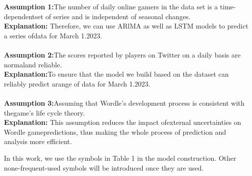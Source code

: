 \documentclass[12pt]{ctexart}
\begin{document}
\textbf{Assumption 1:}The number of daily online gamers in the data set is a time-dependentset of series and is independent of seasonal changes.
\\
\textbf{Explanation:} Therefore, we can use ARlMA as well as LSTM models to predict a series ofdata for March 1.2023.
\\
\\
\textbf{Assumption 2:}The scores reported by players on Twitter on a daily basis are normaland reliable.
\\
\textbf{Explanation:}To ensure that the model we build based on the dataset can reliably predict arange of data for March 1.2023.
\\
\\
\textbf{Assumption 3:}Assuming that Wordle's development process is consistent with thegame's life cycle theory.
\\
\textbf{Explanation:} This assumption reduces the impact ofexternal uncertainties on Wordle gamepredictions, thus making the whole process of prediction and analysis more efficient.

In this work, we use the symbols in Table 1 in the model construction. Other none-frequent-used symbols will be introduced once they are used.


\end{document}

